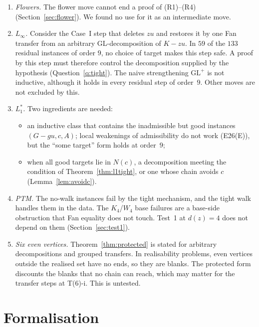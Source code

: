 \documentclass[11pt]{amsart}
\theoremstyle{definition}
\begin{document}
\begin{enumerate}
\item \emph{Flowers.} The flower move cannot end a proof of (R1)--(R4)
(Section~\ref{sec:flower}). We found no use for it as an intermediate move.
\item \emph{$L_\infty$.} Consider the Case~I step that deletes $zu$ and restores it by one Fan
transfer from an arbitrary GL-decomposition of $K-zu$. In $59$ of the $133$ residual instances of
order $9$, no choice of target makes this step safe. A proof by this step must therefore control the
decomposition supplied by the hypothesis (Question~\ref{q:tight}). The naive strengthening
$\mathrm{GL}^+$ is not inductive, although it holds in every residual step of order~$9$. Other moves
are not excluded by this.
\item \emph{$L_1^*$.} Two ingredients are needed:
  \begin{itemize}
  \item an inductive class that contains the inadmissible but good instances $(G-gu,c,A)$; local
  weakenings of admissibility do not work (E26(E)), but the ``some target'' form holds at order~$9$;
  \item when all good targets lie in $N(c)$, a decomposition meeting the condition of
  Theorem~\ref{thm:l1tight}, or one whose chain avoids $c$ (Lemma~\ref{lem:avoidc}).
  \end{itemize}
\item \emph{PTM.} The no-walk instances fail by the tight mechanism, and the tight walk handles them
in the data. The $K_4$/$W_4$ base failures are a base-side obstruction that Fan equality does not
touch. Test~1 at $d(z)=4$ does not depend on them (Section~\ref{sec:test1}).
\item \emph{Six even vertices.} Theorem~\ref{thm:protected} is stated for arbitrary decompositions
and grouped transfers. In realisability problems, even vertices outside the realised set have no
ends, so they are blanks. The protected form discounts the blanks that no chain can reach, which
may matter for the transfer steps at T(6)-i. This is untested.
\end{enumerate}

\section{Formalisation}\label{sec:lean}
\end{document}

